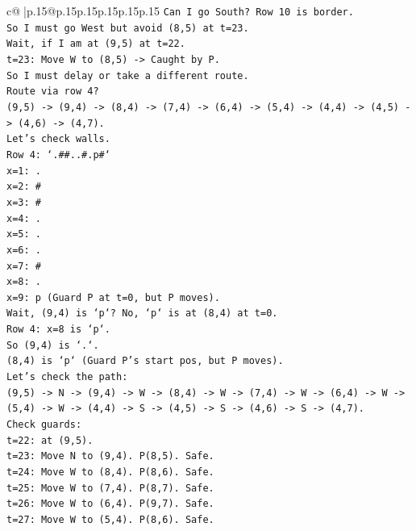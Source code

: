 \documentclass{article}
\begin{document}
{\begin{supertabular}{c@{$\;$}|p{.15\linewidth}@{}p{.15\linewidth}p{.15\linewidth}p{.15\linewidth}p{.15\linewidth}p{.15\linewidth}}
{{{\texttt{Can I go South? Row 10 is border.} \\
\texttt{So I must go West but avoid (8,5) at t=23.} \\
\texttt{Wait, if I am at (9,5) at t=22.} \\
\texttt{t=23: Move W to (8,5) {-}> Caught by P.} \\
\texttt{So I must delay or take a different route.} \\
\texttt{Route via row 4?} \\
\texttt{(9,5) {-}> (9,4) {-}> (8,4) {-}> (7,4) {-}> (6,4) {-}> (5,4) {-}> (4,4) {-}> (4,5) {-}> (4,6) {-}> (4,7).} \\
\texttt{Let's check walls.} \\
\texttt{Row 4: `.\#\#..\#.p\#`} \\
\texttt{x=1: .} \\
\texttt{x=2: \#} \\
\texttt{x=3: \#} \\
\texttt{x=4: .} \\
\texttt{x=5: .} \\
\texttt{x=6: .} \\
\texttt{x=7: \#} \\
\texttt{x=8: .} \\
\texttt{x=9: p (Guard P at t=0, but P moves).} \\
\texttt{Wait, (9,4) is `p`? No, `p` is at (8,4) at t=0.} \\
\texttt{Row 4: x=8 is `p`.} \\
\texttt{So (9,4) is `.`.} \\
\texttt{(8,4) is `p` (Guard P's start pos, but P moves).} \\
\texttt{Let's check the path:} \\
\texttt{(9,5) {-}> N {-}> (9,4) {-}> W {-}> (8,4) {-}> W {-}> (7,4) {-}> W {-}> (6,4) {-}> W {-}> (5,4) {-}> W {-}> (4,4) {-}> S {-}> (4,5) {-}> S {-}> (4,6) {-}> S {-}> (4,7).} \\
\texttt{Check guards:} \\
\texttt{t=22: at (9,5).} \\
\texttt{t=23: Move N to (9,4). P(8,5). Safe.} \\
\texttt{t=24: Move W to (8,4). P(8,6). Safe.} \\
\texttt{t=25: Move W to (7,4). P(8,7). Safe.} \\
\texttt{t=26: Move W to (6,4). P(9,7). Safe.} \\
\texttt{t=27: Move W to (5,4). P(8,6). Safe.} \\
}}}
\end{supertabular}}
\end{document}
